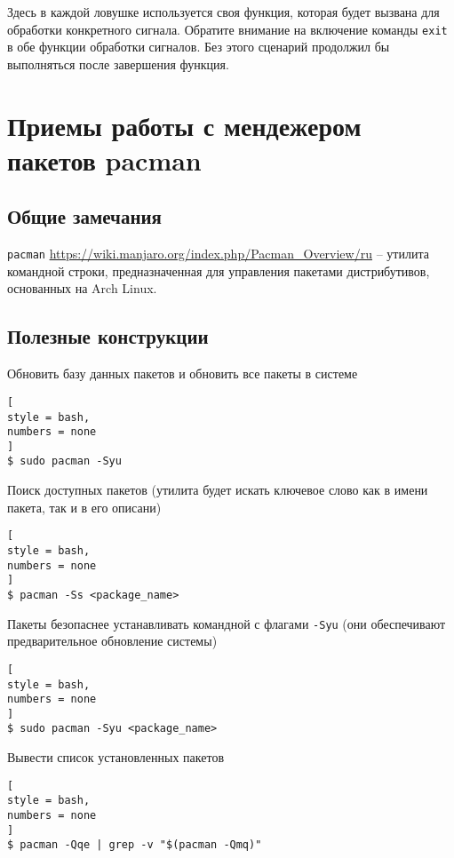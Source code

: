 \documentclass[%
	11pt,
	a4paper,
	utf8,
		]{article}
\begin{document}
Здесь в каждой ловушке используется своя функция, которая будет вызвана для обработки конкретного сигнала. Обратите внимание на включение команды \texttt{exit} в обе функции обработки сигналов. Без этого сценарий продолжил бы выполняться после завершения функция.

\section{Приемы работы с мендежером пакетов pacman}

\subsection{Общие замечания}

\texttt{pacman} \url{https://wiki.manjaro.org/index.php/Pacman_Overview/ru} -- утилита командной строки, предназначенная для управления пакетами дистрибутивов, основанных на Arch Linux.

\subsection{Полезные конструкции}

Обновить базу данных пакетов и обновить все пакеты в системе
\begin{lstlisting}[
style = bash,
numbers = none
]
$ sudo pacman -Syu
\end{lstlisting}

Поиск доступных пакетов (утилита будет искать ключевое слово как в имени пакета, так и в его описани)
\begin{lstlisting}[
style = bash,
numbers = none
]
$ pacman -Ss <package_name>
\end{lstlisting}


Пакеты безопаснее устанавливать командной с флагами \verb*|-Syu| (они обеспечивают предварительное обновление системы)
\begin{lstlisting}[
style = bash,
numbers = none
]
$ sudo pacman -Syu <package_name>
\end{lstlisting}

Вывести список установленных пакетов
\begin{lstlisting}[
style = bash,
numbers = none
]
$ pacman -Qqe | grep -v "$(pacman -Qmq)"
\end{lstlisting}
\end{document}
